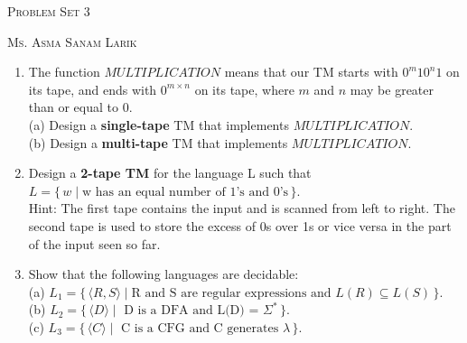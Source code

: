 \documentclass[11pt, article, oneside]{memoir}
\newcommand{\set}[1]{\{\, #1\, \}}
\begin{document}
\begin{center}
\LARGE{\textsc{Problem Set 3}}
 
\large{\textsc{Ms. Asma Sanam Larik}}
\end{center}


\begin{enumerate}
    \item
    The function \(MULTIPLICATION\) means that our TM starts with \(0^m10^n1\) on its tape, and ends with \(0^{m \times n}\) on its tape, where \(m\) and \(n\) may be greater than or equal to 0.
    \\(a) Design a \textbf{single-tape} TM that implements \(MULTIPLICATION\).
    \\(b) Design a \textbf{multi-tape} TM that implements \(MULTIPLICATION\).
   

    \item
    Design a \textbf{2-tape TM} for the language L such that \(L = \set{w \mid \text{w has an equal number of 1's and 0's}}\).
    \\Hint: The first tape contains the input and is scanned from left to right. The second tape is used to store the excess of 0s over 1s or vice versa in the part of the input seen so far.

    \item
    Show that the following languages are decidable:
    \\(a) \(L_1 = \set{\langle R, S\rangle \mid \text{R and S are regular expressions and }L(R) \subseteq L(S)}\).
    \\(b) \(L_2 = \set{\langle D\rangle \mid \text{ D is a DFA and L(D) = }\Sigma^*}\).
    \\(c) \(L_3 = \set{\langle C\rangle \mid \text{ C is a CFG and C generates }\lambda}\).


\end{enumerate}
\end{document}
